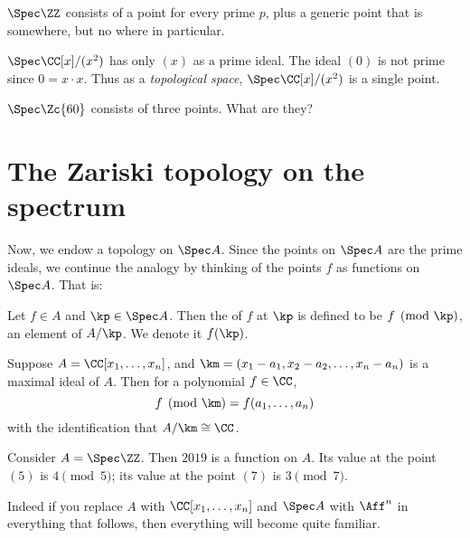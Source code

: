 \begin{example}
	\listhack
	\begin{enumerate}[(a)]
		\ii $\Spec \ZZ$ consists of a point for every prime $p$,
		plus a generic point that is somewhere, but no where in particular.

		\ii $\Spec \CC[x] / (x^2)$ has only $(x)$ as a prime ideal.
		The ideal $(0)$ is not prime since $0 = x \cdot x$.
		Thus as a \emph{topological space},
		$\Spec \CC[x] / (x^2)$ is a single point.

		\ii $\Spec \Zc{60}$ consists of three points.
		What are they?
	\end{enumerate}
\end{example}

\section{The Zariski topology on the spectrum}

Now, we endow a topology on $\Spec A$.
Since the points on $\Spec A$ are the prime ideals, we continue
the analogy by thinking of the points $f$ as functions on $\Spec A$. That is:
\begin{definition}
	Let $f \in A$ and $\kp \in \Spec A$.
	Then the  of $f$ at $\kp$ is defined to be $f \pmod{\kp}$,
	an element of $A/\kp$.
	We denote it $f(\kp)$.
\end{definition}
\begin{example}
	Suppose $A = \CC[x_1, \dots, x_n]$,
	and $\km = (x_1-a_1, x_2-a_2, \dots, x_n-a_n)$ is a maximal ideal of $A$.
	Then for a polynomial $f \in \CC$,
	\[ f \pmod \km = f(a_1, \dots, a_n) \]
	with the identification that $A/\km \cong \CC$.
\end{example}
\begin{example}
	Consider $A = \Spec \ZZ$.
	Then $2019$ is a function on $A$.
	Its value at the point $(5)$ is $4 \pmod 5$;
	its value at the point $(7)$ is $3 \pmod 7$.
\end{example}

Indeed if you replace $A$ with $\CC[x_1, \dots, x_n]$
and $\Spec A$ with $\Aff^n$ in everything that follows,
then everything will become quite familiar.

